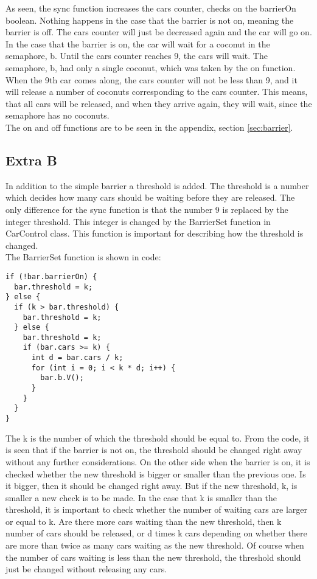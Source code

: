As seen, the sync function increases the cars counter, checks on the barrierOn boolean. Nothing happens in the case that the barrier is not on, meaning the barrier is off. The cars counter will just be decreased again and the car will go on. \\
In the case that the barrier is on, the car will wait for a coconut in the semaphore, b. Until the cars counter reaches 9, the cars will wait. The semaphore, b, had only a single coconut, which was taken by the on function. When the 9th car comes along, the cars counter will not be less than 9, and it will release a number of coconuts corresponding to the cars counter. This means, that all cars will be released, and when they arrive again, they will wait, since the semaphore has no coconuts. \\
The on and off functions are to be seen in the appendix, section \ref{sec:barrier}.

\subsection{Extra B}
In addition to the simple barrier a threshold is added. The threshold is a number which decides how many cars should be waiting before they are released. The only difference for the sync function is that the number 9 is replaced by the integer threshold. This integer is changed by the BarrierSet function in CarControl class. This function is important for describing how the threshold is changed.\\
The BarrierSet function is shown in code:

\begin{lstlisting}
if (!bar.barrierOn) {
  bar.threshold = k;
} else {
  if (k > bar.threshold) {
    bar.threshold = k;
  } else {
    bar.threshold = k;
    if (bar.cars >= k) {
      int d = bar.cars / k;
      for (int i = 0; i < k * d; i++) {
        bar.b.V();
      }
    }
  }
}
\end{lstlisting}
\vspace{.8cm}

The k is the number of which the threshold should be equal to. From the code, it is seen that if the barrier is not on, the threshold should be changed right away without any further considerations. On the other side when the barrier is on, it is checked whether the new threshold is bigger or smaller than the previous one. Is it bigger, then it should be changed right away. But if the new threshold, k, is smaller a new check is to be made. In the case that k is smaller than the threshold, it is important to check whether the number of waiting cars are larger or equal to k. Are there more cars waiting than the new threshold, then k number of cars should be released, or d times k cars depending on whether there are more than twice as many cars waiting as the new threshold. Of course when the number of cars waiting is less than the new threshold, the threshold should just be changed without releasing any cars.
\\

